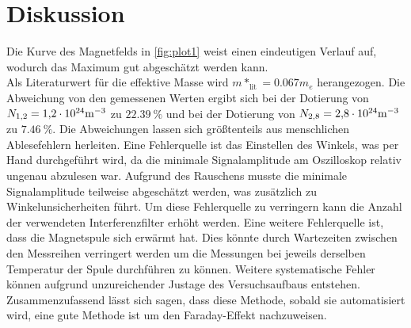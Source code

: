 \section{Diskussion}
\label{sec:Diskussion}
Die Kurve des Magnetfelds in \autoref{fig:plot1} weist einen eindeutigen Verlauf auf, wodurch das Maximum gut abgeschätzt werden kann.\\
Als Literaturwert für die effektive Masse wird $m*_{\text{lit}}= 0.067 m_e$ \cite{effektiveMasseGaAs} herangezogen. Die Abweichung von den gemessenen
Werten ergibt sich bei der Dotierung von $N_{1,2}= \num{1.2 e24} \unit[per-mode=reciprocal]{\per\cubic\meter}$ zu $\qty{22.39}{\percent}$ und bei der Dotierung 
von $N_{2,8}= \num{2.8 e24} \unit[per-mode=reciprocal]{\per\cubic\meter}$zu $\qty{7.46}{\percent}$.
Die Abweichungen lassen sich größtenteils aus menschlichen Ablesefehlern herleiten. 
Eine Fehlerquelle ist das Einstellen des Winkels, was per Hand durchgeführt wird, da die minimale Signalamplitude am Oszilloskop relativ ungenau
abzulesen war. Aufgrund des Rauschens musste die minimale Signalamplitude teilweise abgeschätzt werden, was zusätzlich zu Winkelunsicherheiten 
führt. Um diese Fehlerquelle zu verringern kann die Anzahl der verwendeten Interferenzfilter erhöht werden. Eine weitere Fehlerquelle ist, dass die Magnetspule
sich erwärmt hat. Dies könnte durch Wartezeiten zwischen den Messreihen verringert werden um die Messungen bei jeweils derselben Temperatur
der Spule durchführen zu können.
Weitere systematische Fehler können aufgrund unzureichender Justage des Versuchsaufbaus entstehen.\\
Zusammenzufassend lässt sich sagen, dass diese Methode, sobald sie automatisiert wird, eine gute Methode ist um den Faraday-Effekt nachzuweisen.
\newpage

